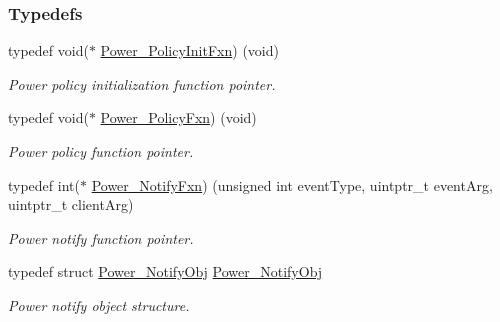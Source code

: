 \subsubsection*{Typedefs}
\begin{DoxyCompactItemize}
\item 
typedef void($\ast$ \hyperlink{_power_8h_a435fdeb71d13ea6be86f599c9b6a0d78}{Power\+\_\+\+Policy\+Init\+Fxn}) (void)
\begin{DoxyCompactList}\small\item\em Power policy initialization function pointer. \end{DoxyCompactList}\item 
typedef void($\ast$ \hyperlink{_power_8h_a333038d1e9cd5f93dda7b83f8a1afa8b}{Power\+\_\+\+Policy\+Fxn}) (void)
\begin{DoxyCompactList}\small\item\em Power policy function pointer. \end{DoxyCompactList}\item 
typedef int($\ast$ \hyperlink{_power_8h_a91335240b2081eeefec80d043030c857}{Power\+\_\+\+Notify\+Fxn}) (unsigned int event\+Type, uintptr\+\_\+t event\+Arg, uintptr\+\_\+t client\+Arg)
\begin{DoxyCompactList}\small\item\em Power notify function pointer. \end{DoxyCompactList}\item 
typedef struct \hyperlink{struct_power___notify_obj}{Power\+\_\+\+Notify\+Obj} \hyperlink{_power_8h_a27497a9f3e7d41b6a0c12aa96c2dc766}{Power\+\_\+\+Notify\+Obj}
\begin{DoxyCompactList}\small\item\em Power notify object structure. \end{DoxyCompactList}\end{DoxyCompactItemize}
